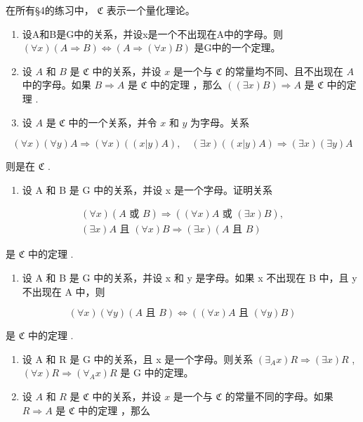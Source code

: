 \exercisegroup

在所有§4的练习中， \(\mathfrak{C}\) 表示一个量化理论。

\begin{enumerate}
\def\labelenumi{\arabic{enumi}.}
\item
  设A和B是G中的关系，并设x是一个不出现在A中的字母。则 \((\forall x)(A \Longrightarrow B) \Longleftrightarrow (A \Longrightarrow (\forall x)B)\) 是G中的一个定理。
\item
  设 \(A\) 和 \(B\) 是 \(\mathfrak{C}\) 中的关系，并设 \(x\) 是一个与 \(\mathfrak{C}\) 的常量均不同、且不出现在 \(A\) 中的字母。如果 \(B \Longrightarrow A\) 是 \(\mathfrak{C}\) 中的定理 ，那么 \(((\exists x)B) \Longrightarrow A\) 是 \(\mathfrak{C}\) 中的定理 .
\item
  设 \(A\) 是 \(\mathfrak{C}\) 中的一个关系，并令 \(x\) 和 \(y\) 为字母。关系
\end{enumerate}

\[
(\forall x) (\forall y) A \Longrightarrow (\forall x) ((x | y) A), \quad (\exists x) ((x | y) A) \Longrightarrow (\exists x) (\exists y) A
\]

则是在 \(\mathfrak{C}\) .

\begin{enumerate}
\def\labelenumi{\arabic{enumi}.}
\setcounter{enumi}{3}
\tightlist
\item
  设 A 和 B 是 G 中的关系，并设 x 是一个字母。证明关系
\end{enumerate}

\[
\begin{array}{l} (\forall x) (A \text { 或 } B) \Longrightarrow ((\forall x) A \text { 或 } (\exists x) B), \\ (\exists x) A \text { 且 } (\forall x) B \Longrightarrow (\exists x) (A \text { 且 } B) \end{array}
\]

是 \(\mathfrak{C}\) 中的定理 .

\begin{enumerate}
\def\labelenumi{\arabic{enumi}.}
\setcounter{enumi}{4}
\tightlist
\item
  设 A 和 B 是 G 中的关系，并设 x 和 y 是字母。如果 x 不出现在 B 中，且 y 不出现在 A 中，则
\end{enumerate}

\[
(\forall x) (\forall y) (A \text {   且   } B) \iff ((\forall x) A \text {   且   } (\forall y) B)
\]

是 \(\mathfrak{C}\) 中的定理 .

\begin{enumerate}
\def\labelenumi{\arabic{enumi}.}
\setcounter{enumi}{5}
\item
  设 A 和 R 是 G 中的关系，且 x 是一个字母。则关系 \((\exists_{A}x)R \Longrightarrow (\exists x)R\) , \((\forall x)R \Longrightarrow (\forall_{A}x)R\) 是 G 中的定理。
\item
  设 \(A\) 和 \(R\) 是 \(\mathfrak{C}\) 中的关系，并设 \(x\) 是一个与 \(\mathfrak{C}\) 的常量不同的字母。如果 \(R \Longrightarrow A\) 是 \(\mathfrak{C}\) 中的定理 ，那么
\end{enumerate}

